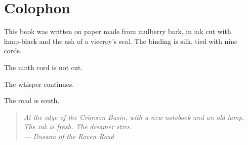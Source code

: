 \documentclass[10pt,twoside]{book}
\newcommand{\dusana}[1]{\begin{quote}\itshape #1 \\ --- Dusana of the Raven Road\end{quote}}
\begin{document}
\chapter*{Colophon}

This book was written on paper made from mulberry bark, in ink cut with lamp‑black and the ash of a viceroy's seal. The binding is silk, tied with nine cords.

The ninth cord is not cut.

The whisper continues.

The road is south.

\dusana{At the edge of the Crimson Basin, with a new notebook and an old lamp. The ink is fresh. The dreamer stirs.}
\end{document}
